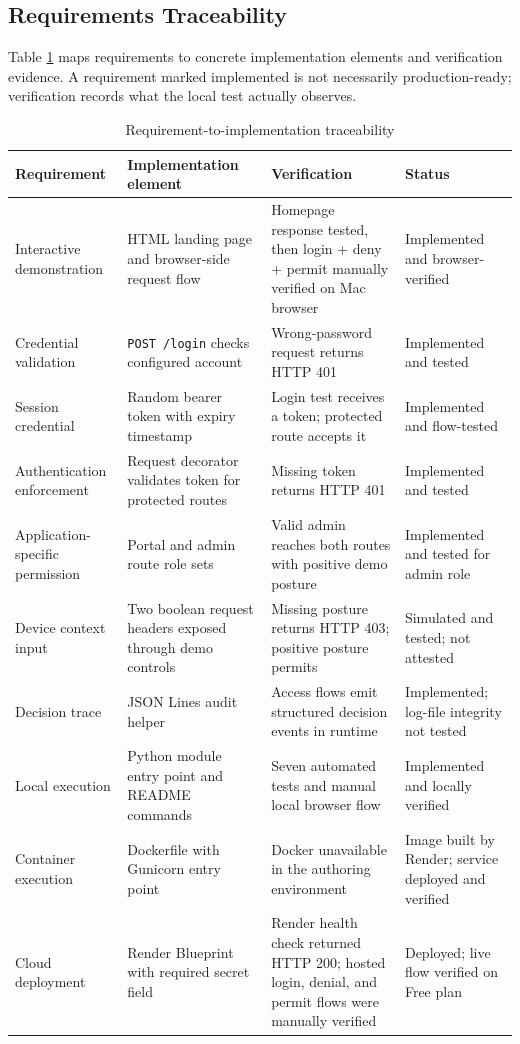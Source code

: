 \subsection{Requirements Traceability}
Table \ref{tab:trace} maps requirements to concrete implementation elements and verification evidence. A requirement marked implemented is not necessarily production-ready; verification records what the local test actually observes.
\begin{table}[t]
\caption{Requirement-to-implementation traceability}
\label{tab:trace}
\centering
\begin{tabular}{p{}p{}p{}p{}}
\toprule
Requirement & Implementation element & Verification & Status\\
\midrule
Interactive demonstration & HTML landing page and browser-side request flow & Homepage response tested, then login + deny + permit manually verified on Mac browser & Implemented and browser-verified\\
Credential validation & \texttt{POST /login} checks configured account & Wrong-password request returns HTTP 401 & Implemented and tested\\
Session credential & Random bearer token with expiry timestamp & Login test receives a token; protected route accepts it & Implemented and flow-tested\\
Authentication enforcement & Request decorator validates token for protected routes & Missing token returns HTTP 401 & Implemented and tested\\
Application-specific permission & Portal and admin route role sets & Valid admin reaches both routes with positive demo posture & Implemented and tested for admin role\\
Device context input & Two boolean request headers exposed through demo controls & Missing posture returns HTTP 403; positive posture permits & Simulated and tested; not attested\\
Decision trace & JSON Lines audit helper & Access flows emit structured decision events in runtime & Implemented; log-file integrity not tested\\
Local execution & Python module entry point and README commands & Seven automated tests and manual local browser flow & Implemented and locally verified\\
Container execution & Dockerfile with Gunicorn entry point & Docker unavailable in the authoring environment & Image built by Render; service deployed and verified\\
Cloud deployment & Render Blueprint with required secret field & Render health check returned HTTP 200; hosted login, denial, and permit flows were manually verified & Deployed; live flow verified on Free plan\\
\bottomrule
\end{tabular}
\end{table}

